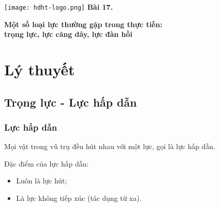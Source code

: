 \newcommand{\chapter}[2][]{
	\newcommand{\chapname}{#2}
	\begin{flushleft}
		\begin{minipage}[t]{\linewidth}
			\texttt{[image: hdht-logo.png]}
			\hspace{0pt}	
			\sffamily\bfseries\large Bài  17.
			\begin{flushleft}
				\LARGE\bfseries #1
			\end{flushleft}
		\end{minipage}
	\end{flushleft}
	\vspace{1cm}
	\normalfont\normalsize
}
\chapter[Một số loại lực thường gặp trong thực tiễn: \\trọng lực, lực căng dây, lực đàn hồi]{Một số loại lực thường gặp trong thực tiễn:\\ Trọng lực, lực căng dây, lực đàn hồi}
\section{Lý thuyết}

\subsection{Trọng lực - Lực hấp dẫn}
\vspace{-0.5cm}
\subsubsection{Lực hấp dẫn}
Mọi vật trong vũ trụ đều hút nhau với một lực, gọi là lực hấp dẫn.

 Đặc điểm của lực hấp dẫn:	
\begin{itemize}
	\item Luôn là lực hút;
	\item Là lực không tiếp xúc (tác dụng từ xa).
\end{itemize}

